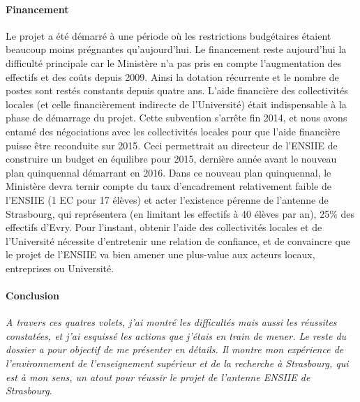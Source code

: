 \documentclass[11pt]{article}
\begin{document}
\paragraph{Financement}
Le projet  a été démarré à  une période où les  restrictions budgétaires étaient
beaucoup moins  prégnantes qu'aujourd'hui.  Le financement  reste aujourd'hui la
difficulté principale car le Ministère n'a pas pris en compte l'augmentation des
effectifs et des coûts depuis 2009. Ainsi la dotation récurrente et le nombre de
postes  sont  restés  constants  depuis   quatre  ans.   L'aide  financière  des
collectivités locales (et celle  financièrement indirecte de l'Université) était
indispensable à la  phase de démarrage du projet. Cette  subvention s'arrête fin
2014, et nous avons entamé des  négociations avec les collectivités locales pour
que  l'aide financière  puisse être  reconduite sur  2015.  Ceci  permettrait au
directeur de l'ENSIIE  de construire un budget en équilibre  pour 2015, dernière
année avant le nouveau plan quinquennal  démarrant en 2016. Dans ce nouveau plan
quinquennal, le Ministère devra ternir compte du taux d'encadrement relativement
faible  de l'ENSIIE  (1  EC pour  17  élèves) et  acter  l'existence pérenne  de
l'antenne de Strasbourg, qui représentera (en limitant les effectifs à 40 élèves
par  an),  25\%  des  effectifs  d'Evry.  Pour  l'instant,  obtenir  l'aide  des
collectivités locales et de l'Université  nécessite d'entretenir une relation de
confiance,  et de  convaincre  que le  projet  de l'ENSIIE  va  bien amener  une
plus-value aux acteurs locaux, entreprises ou Université.\\



\bigskip
\paragraph{Conclusion}
\emph{A travers ces  quatres volets, j'ai montré les difficultés  mais aussi les
  réussites constatées,  et j'ai esquissé  les actions  que j'étais en  train de
  mener.  Le  reste du dossier  a pour objectif de  me présenter en  détails. Il
  montre mon expérience de l'environnement  de l'enseignement supérieur et de la
  recherche à Strasbourg, qui est à mon sens, un atout pour réussir le projet de
  l'antenne ENSIIE de Strasbourg.}
  





\newpage
\end{document}
